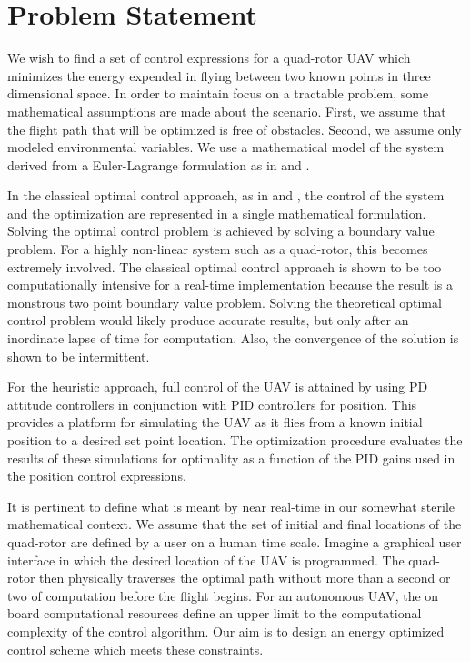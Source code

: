 
\chapter{Problem Statement} %

\label{Chapter2} %




We wish to find a set of control expressions for a quad-rotor UAV which minimizes the energy expended in flying between two known points in three dimensional space. In order to maintain focus on a tractable problem, some mathematical assumptions are made about the scenario. First, we assume that the flight path that will be optimized is free of obstacles. Second, we assume only modeled environmental variables. We use a mathematical model of the system derived from a Euler-Lagrange formulation as in \cite{Luukkonen} and \cite{bouabdallah2004pid}. 


In the classical optimal control approach, as in \cite{BrysonHo69} and \cite{lewis2012optimal}, the control of the system and the optimization are represented in a single mathematical formulation. Solving the optimal control problem is achieved by solving a boundary value problem. For a highly non-linear system such as a quad-rotor, this becomes extremely involved. The classical optimal control approach is shown to be too computationally intensive for a real-time implementation because the result is a monstrous two point boundary value problem. Solving the theoretical optimal control problem would likely produce accurate results, but only after an inordinate lapse of time for computation. Also, the convergence of the solution is shown to be intermittent. 

For the heuristic approach, full control of the UAV is attained by using PD attitude controllers in conjunction with PID controllers for position. This provides a platform for simulating the UAV as it flies from a known initial position to a desired set point location. The optimization procedure evaluates the results of these simulations for optimality as a function of the PID gains used in the position control expressions.   

It is pertinent to define what is meant by near real-time in our somewhat sterile mathematical context. We assume that the set of initial and final locations of the quad-rotor are defined by a user on a human time scale. Imagine a graphical user interface in which the desired location of the UAV is programmed. The quad-rotor then physically traverses the optimal path without more than a second or two of computation before the flight begins. For an autonomous UAV, the on board computational resources define an upper limit to the computational complexity of the control algorithm. Our aim is to design an energy optimized control scheme which meets these constraints. 

